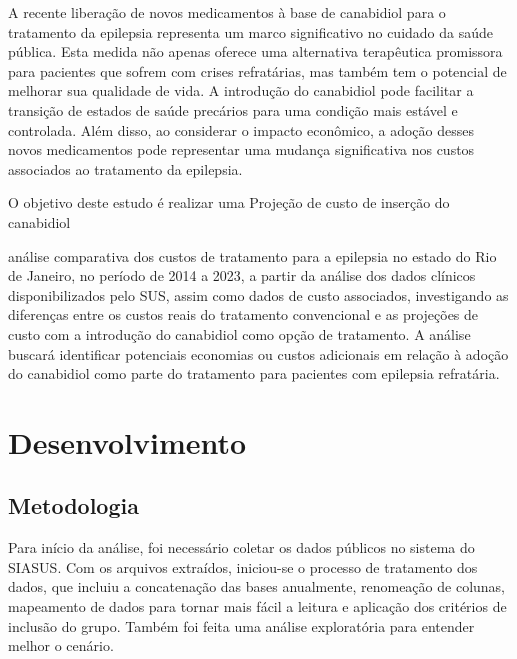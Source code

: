 \documentclass[article,a4paper,12pt,brazil,sumario=tradicional]{abntex2}
\begin{document}
A recente liberação de novos medicamentos à base de canabidiol para o tratamento da epilepsia representa um marco significativo no cuidado da saúde pública. Esta medida não apenas oferece uma alternativa terapêutica promissora para pacientes que sofrem com crises refratárias, mas também tem o potencial de melhorar sua qualidade de vida. A introdução do canabidiol pode facilitar a transição de estados de saúde precários para uma condição mais estável e controlada. Além disso, ao considerar o impacto econômico, a adoção desses novos medicamentos pode representar uma mudança significativa nos custos associados ao tratamento da epilepsia.

O objetivo deste estudo é realizar uma Projeção de custo de inserção do canabidiol

análise comparativa dos custos de tratamento para a epilepsia no estado do Rio de Janeiro, no período de 2014 a 2023, a partir da análise dos dados clínicos disponibilizados pelo SUS, assim como dados de custo associados, investigando as diferenças entre os custos reais do tratamento convencional e as projeções de custo com a introdução do canabidiol como opção de tratamento. A análise buscará identificar potenciais economias ou custos adicionais em relação à adoção do canabidiol como parte do tratamento para pacientes com epilepsia refratária.

\section{Desenvolvimento}

\subsection{Metodologia}

Para início da análise, foi necessário coletar os dados públicos no sistema do SIASUS. Com os arquivos extraídos, iniciou-se o processo de tratamento dos dados, que incluiu a concatenação das bases anualmente, renomeação de colunas, mapeamento de dados para tornar mais fácil a leitura e aplicação dos critérios de inclusão do grupo. Também foi feita uma análise exploratória para entender melhor o cenário.
\end{document}
